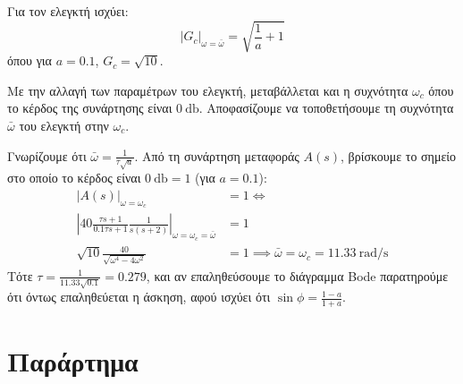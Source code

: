 \documentclass[11pt,a4paper,notitlepage,fleqn,final]{article}
\begin{document}
\begin{exercise}
\begin{enumgreekparen}
	\item Για τον ελεγκτή ισχύει:
	\[
	\left|G_c\right|_{\omega=\bar\omega} = \sqrt{\frac{1}{a} + 1}
	\]
	όπου για \( a=0.1 \), \( G_c = \sqrt{10} \).
	
	Με την αλλαγή των παραμέτρων του ελεγκτή, μεταβάλλεται και η συχνότητα \( \omega_c \)
	όπου το κέρδος της συνάρτησης είναι \( \SI{0}{\decibel} \). Αποφασίζουμε να τοποθετήσουμε
	τη συχνότητα \( \bar\omega \) του ελεγκτή στην \( \omega_c \).
	
	Γνωρίζουμε ότι \( \bar\omega = \frac{1}{τ\sqrt{a}} \). Από τη συνάρτηση μεταφοράς
	\( A(s) \), βρίσκουμε το σημείο στο οποίο το κέρδος είναι \( \SI{0}{\decibel} = 1 \)
	(για \( a=0.1 \)):
	\begin{align*}
	\left|A(s)\right|_{\omega=\omega_c} &= 1 \iff \\
		\left| 40\frac{τs+1}{0.1τs+1}\frac{1}{s(s+2)}\right|_{\omega=\omega_c=\bar\omega} &= 1\\
		\sqrt{10}\frac{40}{\sqrt{\omega^4-4\omega^2}}&=1 \implies
	\bar\omega = \omega_c = \SI{11.33}{\radian/\second}
	\end{align*}
	Τότε \( τ=\frac{1}{11.33\sqrt{0.1}}=0.279 \), και αν επαληθεύσουμε το διάγραμμα Bode
	παρατηρούμε ότι όντως επαληθεύεται η άσκηση, αφού ισχύει ότι \( \sin\phi = \frac{1-a}{1+a} \).
\end{enumgreekparen}
\end{exercise}

\newpage
\appendix

\section*{Παράρτημα}


\end{document}
